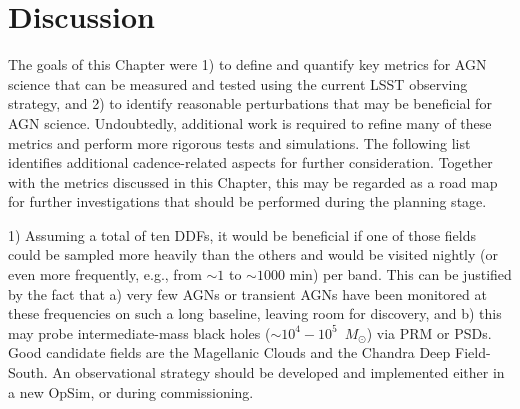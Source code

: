 
% 


% 


% 


% 


 







\section{Discussion}
\label{sec:\chpname:discussion}


The goals of this Chapter were 1) to define and quantify key metrics for AGN
science that can be measured and tested using the current LSST observing
strategy, and 2) to identify reasonable perturbations that may be beneficial
for AGN science.
%
Undoubtedly, additional work is required to refine many of these metrics
and perform more rigorous tests and simulations.
%
The following list identifies additional cadence-related aspects for further
consideration. Together with the metrics discussed in this Chapter, this may
be regarded as a road map for further investigations that should be performed
during the planning stage.

1) Assuming a total of ten DDFs, it would be beneficial if one of those fields
could be sampled more heavily than the others and would be visited nightly (or
even more frequently, e.g., from $\sim1$ to $\sim1000$ min) per band.
This can be justified by the fact that a) very few AGNs or transient AGNs have
been monitored at these frequencies on such a long baseline, leaving room for
discovery, and b) this may probe intermediate-mass black holes
($\sim10^4 - 10^5$~$M_{\odot}$) via PRM or PSDs. Good candidate fields are
the Magellanic Clouds and the Chandra Deep Field-South. An observational
strategy should be developed and implemented either in a new OpSim, or
during commissioning.

